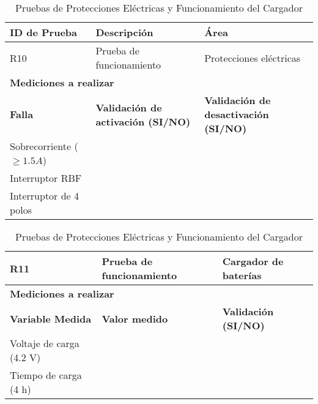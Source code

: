 \newpage



\begin{table}[!ht]
    \centering
    \begin{tabular}{|m{4.5cm}|m{4.5cm}|m{4.5cm}|}
    \hline
        \textbf{ID de Prueba} & \textbf{Descripción} & \textbf{Área}\\ \hline
        R10 & Prueba de funcionamiento & Protecciones eléctricas \\ \hline
        \multicolumn{3}{|l|}{\textbf{\hspace{5 cm}Mediciones a realizar}} \\ \hline
        \textbf{Falla} & \textbf{Validación de activación (SI/NO)} & \textbf{Validación de desactivación (SI/NO)} \\ \hline
        Sobrecorriente ($ \geq 1.5 A$)  & ~ & ~ \\ \hline
        Interruptor RBF & ~ & ~ \\ \hline
        Interruptor de 4 polos & ~ & ~ \\ \hline
    \end{tabular}

    \begin{tabular}{|m{4.5cm}|m{4.5cm}|m{4.5cm}|}
    \hline
        R11 & Prueba de funcionamiento & Cargador de baterías \\ \hline
        \multicolumn{3}{|l|}{\textbf{\hspace{5 cm}Mediciones a realizar}} \\ \hline
        \textbf{Variable Medida} & \textbf{Valor medido} & \textbf{Validación (SI/NO)} \\ \hline
        Voltaje de carga (4.2 V) & ~ & ~ \\ \hline
        Tiempo de carga (4 h) & ~ & ~ \\ \hline
    \end{tabular}
    \caption{Pruebas de Protecciones Eléctricas y Funcionamiento del Cargador}
    \label{tab:electricprotectioncharger}
\end{table}
